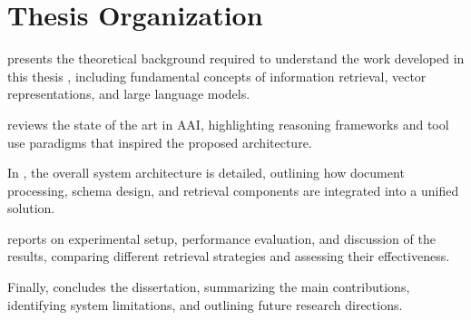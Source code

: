 \section{Thesis Organization}

 presents the theoretical background required to understand the work developed in this thesis , including fundamental concepts of information retrieval, vector representations, and large language models. 

 reviews the state of the art in \gls{AAI}, highlighting reasoning frameworks and tool use paradigms that inspired the proposed architecture. 


In , the overall system architecture is detailed, outlining how document processing, schema design, and retrieval components are integrated into a unified solution.

 reports on experimental setup, performance evaluation, and discussion of the results, comparing different retrieval strategies and assessing their effectiveness. 

Finally,  concludes the dissertation, summarizing the main contributions, identifying system limitations, and outlining future research directions.
